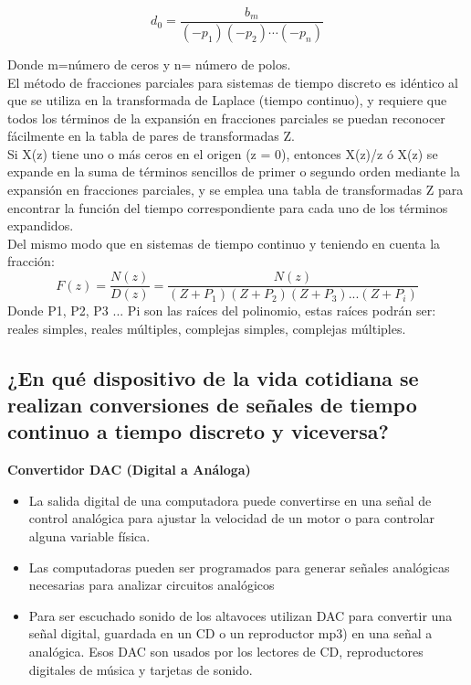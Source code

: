 
\begin{equation}
	d_{0}=\frac{b_{m}}{(- p_{1})(- p_{2}) \cdots (- p_{n})}
\end{equation}

Donde m=número de ceros y n= número de polos.\\    
El método de fracciones parciales para sistemas de tiempo discreto es idéntico al que se utiliza en la transformada de Laplace (tiempo continuo), y requiere que todos los términos de la expansión en fracciones parciales se puedan reconocer fácilmente en la tabla de pares de transformadas Z.\\
Si X(z) tiene uno o más ceros en el origen (z = 0), entonces X(z)/z ó X(z) se expande en la suma de términos sencillos de primer o segundo orden mediante la expansión en fracciones parciales, y se emplea una tabla de transformadas Z para encontrar la función del tiempo correspondiente para cada uno de los términos expandidos.\\    
Del mismo modo que en sistemas de tiempo continuo y teniendo en cuenta la fracción:\\
\[
F(z)=\frac{N(z)}{D(z)}=\frac{N(z)}{(Z+P_{1})(Z+P_{2})(Z+P_{3})...(Z+P_{i})}
\]
Donde P1, P2, P3 ... Pi son las raíces del polinomio, estas raíces podrán ser: reales simples, reales múltiples, complejas simples, complejas múltiples.

\subsection{¿En qué dispositivo de la vida cotidiana se realizan conversiones de señales de tiempo continuo a tiempo discreto y viceversa?}

	
	\textbf{Convertidor DAC (Digital a Análoga)}
	\begin{itemize}
		\item La salida digital de una computadora puede convertirse en una señal de control analógica para ajustar la velocidad de un motor o para controlar alguna variable física.
		\item Las computadoras pueden ser programados para generar señales analógicas necesarias para analizar circuitos analógicos
		\item Para ser escuchado sonido de los altavoces utilizan DAC para convertir una señal digital, guardada en un CD o un reproductor mp3) en una señal a analógica. Esos DAC son usados por los lectores de CD, reproductores digitales de música y tarjetas de sonido.
	\end{itemize}
	

